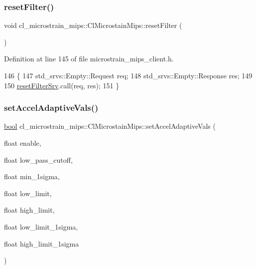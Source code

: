 \subsubsection{\texorpdfstring{reset\+Filter()}{resetFilter()}}
{\footnotesize\ttfamily void cl\+\_\+microstrain\+\_\+mips\+::\+Cl\+Microstain\+Mips\+::reset\+Filter (\begin{DoxyParamCaption}{ }\end{DoxyParamCaption})\hspace{0.3cm}{\ttfamily [inline]}}



Definition at line 145 of file microstrain\+\_\+mips\+\_\+client.\+h.


\begin{DoxyCode}
146     \{
147         std\_srvs::Empty::Request req;
148         std\_srvs::Empty::Response res;
149 
150         \hyperlink{classcl__microstrain__mips_1_1ClMicrostainMips_a3d9eb5c291d70a2fb1b9bde4392e1d48}{resetFilterSrv}.call(req, res);
151     \}
\end{DoxyCode}
\mbox{\label{classcl__microstrain__mips_1_1ClMicrostainMips_a4687c5a4ea6de01c41d96f3aeb58fa24}} 
\subsubsection{\texorpdfstring{set\+Accel\+Adaptive\+Vals()}{setAccelAdaptiveVals()}}
{\footnotesize\ttfamily \hyperlink{classbool}{bool} cl\+\_\+microstrain\+\_\+mips\+::\+Cl\+Microstain\+Mips\+::set\+Accel\+Adaptive\+Vals (\begin{DoxyParamCaption}\item[{float}]{enable,  }\item[{float}]{low\+\_\+pass\+\_\+cutoff,  }\item[{float}]{min\+\_\+1sigma,  }\item[{float}]{low\+\_\+limit,  }\item[{float}]{high\+\_\+limit,  }\item[{float}]{low\+\_\+limit\+\_\+1sigma,  }\item[{float}]{high\+\_\+limit\+\_\+1sigma }\end{DoxyParamCaption})\hspace{0.3cm}{\ttfamily [inline]}}




